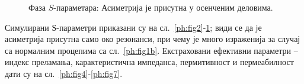 \begin{figure}[!t]
\centering
{}
\hspace*{1cm}
\caption{Фаза $S$-параметара:  Асиметрија је присутна у осенченим деловима.}
\label{ph:fig3}
\end{figure} 
Симулирани $Ѕ$-параметри приказани су на сл.~\ref{ph:fig2}-\ref{ph:fig3}; види се да је асиметрија присутна само око резонанси, при чему је много израженија за случај са нормалним процепима са сл.~\ref{ph:fig1b}. Екстраховани ефективни параметри -- индекс преламања, карактеристична импеданса, пермитивност и пермеабилност дати су на сл.~\ref{ph:fig4}-\ref{ph:fig7}.

